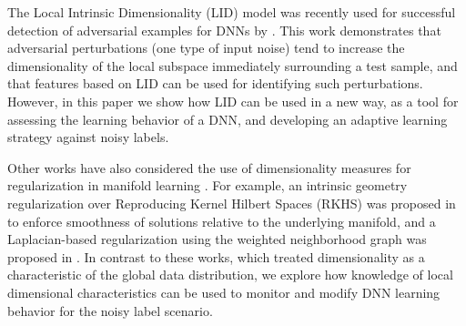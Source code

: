 \documentclass{article}
\begin{document}
The Local Intrinsic Dimensionality (LID) model \cite{houle2017local1} was recently used for successful detection of adversarial examples for DNNs by \cite{ma2018characterizing}. This work demonstrates that adversarial perturbations (one type of input noise) tend to increase the dimensionality of the local subspace immediately surrounding a test sample, and that features based on LID can be used for identifying such perturbations.
However, in this paper we show how LID can be used in a new way, as a tool for assessing the learning behavior of a DNN, and developing an adaptive learning strategy against noisy labels.

Other works have also considered the use of dimensionality measures for regularization in manifold learning \cite{roweis2000nonlinear,belkin2004regularization,belkin2006manifold}. For example, an intrinsic geometry regularization over Reproducing Kernel Hilbert Spaces (RKHS) was proposed in \cite{belkin2006manifold} to enforce smoothness of solutions relative to the underlying manifold, and a Laplacian-based regularization using the weighted neighborhood graph was proposed in \cite{belkin2004regularization}. In contrast to these works, which treated dimensionality as a characteristic of the global data distribution, we explore how knowledge of local dimensional characteristics can be used to monitor and modify DNN learning behavior for the noisy label scenario. 


\end{document}
